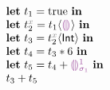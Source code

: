 

\newcommand{\THole}{\ensuremath{\SyEHole{}{}}}
\newcommand{\TInt}{\ensuremath{\SyTInt}}

\newcommand{\ELet}[2]{\ensuremath{\SyLet #1 = #2}}
\newcommand{\ELetAnn}[3]{\ensuremath{\SyLet #1 \SyColon #2 = #3}}
\newcommand{\EInn}{\ensuremath{\SyInn}}
\newcommand{\EIn}[1]{\ensuremath{\SyIn #1}}
\newcommand{\EPlus}[2]{\ensuremath{#1 \SyPlus #2}}
\newcommand{\ETimes}[2]{\ensuremath{#1 \SyTimes #2}}
\newcommand{\ECast}[2]{\ensuremath{#1 \SyCastL #2 \SyCastR}}

\newcommand{\ETrue}{\ensuremath{\SyTrue}}
\newcommand{\EEHole}[1]{\ensuremath{\SyEHole{#1}{\sigma_{#1}}}}

\newcommand{\ENamed}[2]{\ensuremath{t_{#1}^{{\color{gray}#2}}}}


  \[\begin{array}{l}
    \ELet{t_1}{\ETrue} \EInn \\
    \ELet{\ENamed{2}{x}}{\ECast{t_1}{\THole}} \EInn \\
    \ELet{t_3}{\ECast{\ENamed{2}{x}}{\TInt}} \EInn \\
    \ELet{t_4}{\ETimes{t_3}{6}} \EInn \\
    \ELet{t_5}{\EPlus{t_4}{\EEHole{1}}} \EInn \\
    \EPlus{t_3}{t_5}
  \end{array}\]

